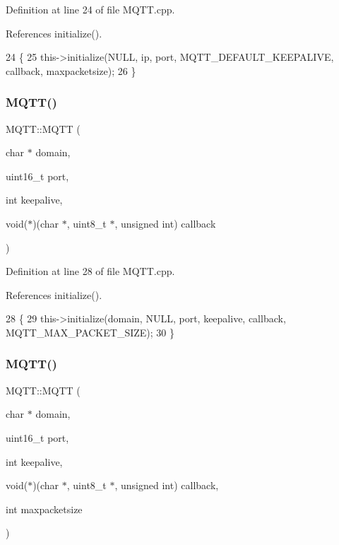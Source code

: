 Definition at line 24 of file M\+Q\+T\+T.\+cpp.



References initialize().


\begin{DoxyCode}
24                                                                                                        \{
25     this->initialize(NULL, ip, port, MQTT_DEFAULT_KEEPALIVE, callback, 
      maxpacketsize);
26 \}
\end{DoxyCode}
\mbox{\label{class_m_q_t_t_a799fede50157a7573f43582ccd429b5e}} 
\subsubsection{M\+Q\+T\+T()\hspace{0.1cm}{\footnotesize\ttfamily [6/9]}}
{\footnotesize\ttfamily M\+Q\+T\+T\+::\+M\+Q\+TT (\begin{DoxyParamCaption}\item[{char $\ast$}]{domain,  }\item[{uint16\+\_\+t}]{port,  }\item[{int}]{keepalive,  }\item[{void($\ast$)(char $\ast$, uint8\+\_\+t $\ast$, unsigned int)}]{callback }\end{DoxyParamCaption})}



Definition at line 28 of file M\+Q\+T\+T.\+cpp.



References initialize().


\begin{DoxyCode}
28                                                                                                     \{
29     this->initialize(domain, NULL, port, keepalive, callback, 
      MQTT_MAX_PACKET_SIZE);
30 \}
\end{DoxyCode}
\mbox{\label{class_m_q_t_t_a418f1aaefd9ebb233358a532d82d2307}} 
\subsubsection{M\+Q\+T\+T()\hspace{0.1cm}{\footnotesize\ttfamily [7/9]}}
{\footnotesize\ttfamily M\+Q\+T\+T\+::\+M\+Q\+TT (\begin{DoxyParamCaption}\item[{char $\ast$}]{domain,  }\item[{uint16\+\_\+t}]{port,  }\item[{int}]{keepalive,  }\item[{void($\ast$)(char $\ast$, uint8\+\_\+t $\ast$, unsigned int)}]{callback,  }\item[{int}]{maxpacketsize }\end{DoxyParamCaption})}



